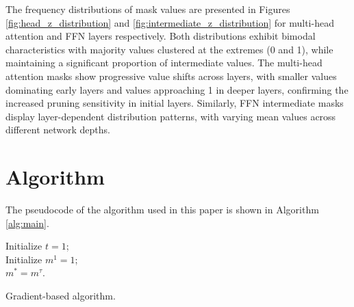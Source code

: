 The frequency distributions of mask values are presented in Figures \ref{fig:head_z_distribution} and \ref{fig:intermediate_z_distribution} for multi-head attention and FFN layers respectively. Both distributions exhibit bimodal characteristics with majority values clustered at the extremes (0 and 1), while maintaining a significant proportion of intermediate values. The multi-head attention masks show progressive value shifts across layers, with smaller values dominating early layers and values approaching 1 in deeper layers, confirming the increased pruning sensitivity in initial layers. Similarly, FFN intermediate masks display layer-dependent distribution patterns, with varying mean values across different network depths.


\section{Algorithm}
The pseudocode of the algorithm used in this paper is shown in Algorithm \ref{alg:main}.

\begin{algorithm2e}[htbp]
\small
\SetAlgoLined
{}
Initialize $t=1$;\\
Initialize $m^1=1$;\\
$m^* = m^{\tau}$.
\caption{Gradient-based algorithm.}
\label{alg:main}
\end{algorithm2e}

